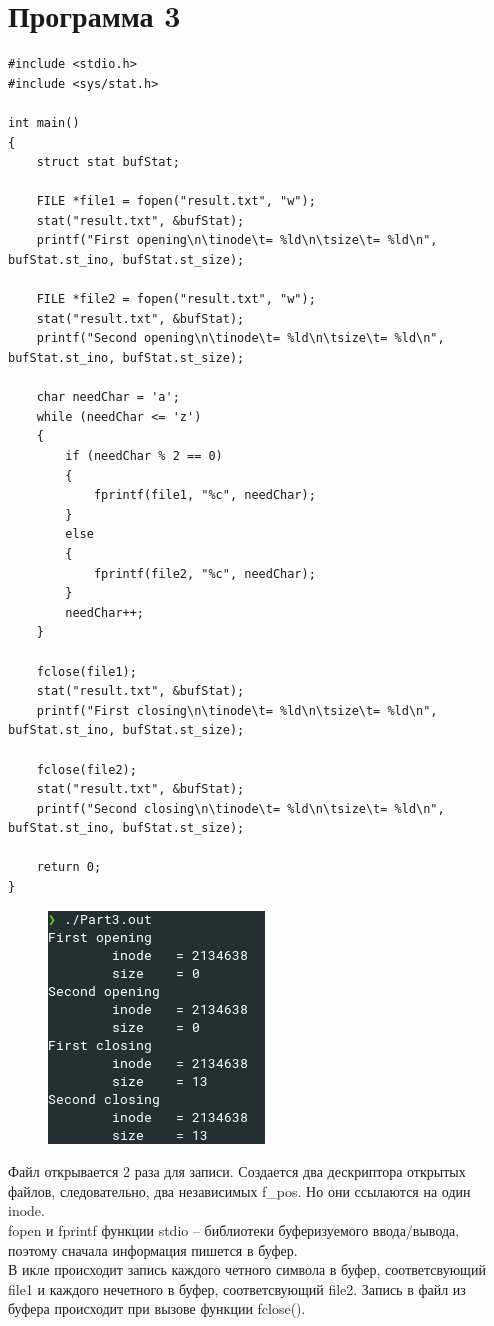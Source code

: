 \documentclass[14pt, a4paper]{extarticle}
\begin{document}
\section*{Программа 3}
\begin{lstlisting}
#include <stdio.h>
#include <sys/stat.h>

int main()
{
	struct stat bufStat;
	
	FILE *file1 = fopen("result.txt", "w");
	stat("result.txt", &bufStat);
	printf("First opening\n\tinode\t= %ld\n\tsize\t= %ld\n", bufStat.st_ino, bufStat.st_size);
	
	FILE *file2 = fopen("result.txt", "w");
	stat("result.txt", &bufStat);
	printf("Second opening\n\tinode\t= %ld\n\tsize\t= %ld\n", bufStat.st_ino, bufStat.st_size);
	
	char needChar = 'a';
	while (needChar <= 'z') 
	{
		if (needChar % 2 == 0)
		{
			fprintf(file1, "%c", needChar);
		}
		else
		{
			fprintf(file2, "%c", needChar);
		}
		needChar++;
	}
	
	fclose(file1);
	stat("result.txt", &bufStat);
	printf("First closing\n\tinode\t= %ld\n\tsize\t= %ld\n", bufStat.st_ino, bufStat.st_size);
	
	fclose(file2);
	stat("result.txt", &bufStat);
	printf("Second closing\n\tinode\t= %ld\n\tsize\t= %ld\n", bufStat.st_ino, bufStat.st_size);
	
	return 0;
}
\end{lstlisting}
\begin{figure}[h!]
	\includegraphics[scale=1]{source/Part3.png}
\end{figure}
Файл открывается 2 раза для записи. Создается два дескриптора открытых файлов, следовательно, два независимых f\_pos. Но они ссылаются на один inode.\\
fopen и fprintf функции stdio – библиотеки буферизуемого ввода/вывода, поэтому сначала информация пишется в буфер. \\
В  икле происходит запись каждого четного символа в буфер, соответсвующий file1 и каждого нечетного в буфер, соответсвующий file2. Запись в файл из буфера происходит при вызове функции fclose().\\
\end{document}
